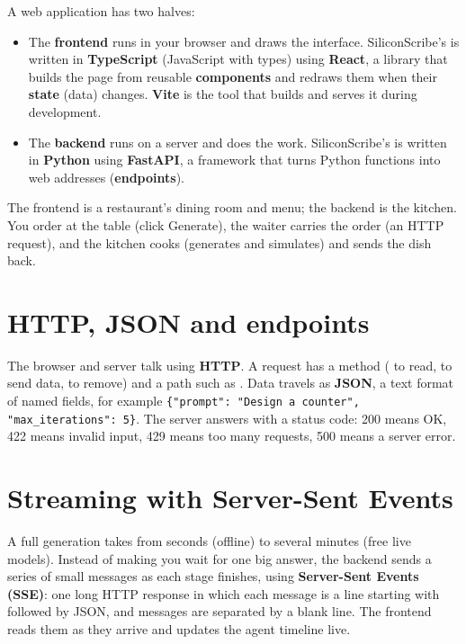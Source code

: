 A web application has two halves:

\begin{itemize}
  \item The \textbf{frontend} runs in your browser and draws the interface. SiliconScribe's is written in \textbf{TypeScript} (JavaScript with types) using \textbf{React}, a library that builds the page from reusable \textbf{components} and redraws them when their \textbf{state} (data) changes. \textbf{Vite} is the tool that builds and serves it during development.
  \item The \textbf{backend} runs on a server and does the work. SiliconScribe's is written in \textbf{Python} using \textbf{FastAPI}, a framework that turns Python functions into web addresses (\textbf{endpoints}).
\end{itemize}

\begin{analogy}
The frontend is a restaurant's dining room and menu; the backend is the kitchen. You order at the table (click Generate), the waiter carries the order (an HTTP request), and the kitchen cooks (generates and simulates) and sends the dish back.
\end{analogy}

\section{HTTP, JSON and endpoints}

The browser and server talk using \textbf{HTTP}. A request has a method ( to read,  to send data,  to remove) and a path such as . Data travels as \textbf{JSON}, a text format of named fields, for example \texttt{\{"prompt": "Design a counter", "max\_iterations": 5\}}. The server answers with a status code: 200 means OK, 422 means invalid input, 429 means too many requests, 500 means a server error.

\section{Streaming with Server-Sent Events}

A full generation takes from seconds (offline) to several minutes (free live models). Instead of making you wait for one big answer, the backend sends a series of small messages as each stage finishes, using \textbf{Server-Sent Events (SSE)}: one long HTTP response in which each message is a line starting with  followed by JSON, and messages are separated by a blank line. The frontend reads them as they arrive and updates the agent timeline live.

